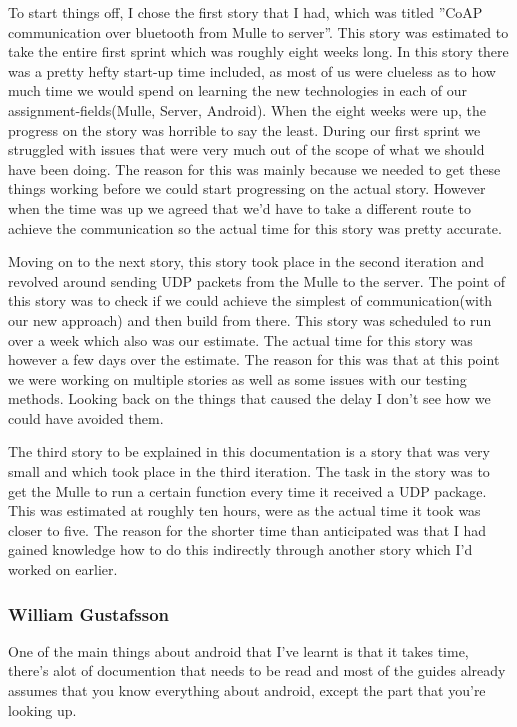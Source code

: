 To start things off, I chose the first story that I had, which was titled ''CoAP communication over bluetooth from Mulle to server''.
This story was estimated to take the entire first sprint which was roughly eight weeks long. In this story there was a pretty hefty start-up time included, 
as most of us were clueless as to how much time we would spend on learning the new technologies in each of our assignment-fields(Mulle, Server, Android).
When the eight weeks were up, the progress on the story was horrible to say the least. During our first sprint we struggled with issues that were very much 
out of the scope of what we should have been doing. The reason for this was mainly because we needed to get these things working before we could start progressing on the actual story.
However when the time was up we agreed that we'd have to take a different route to achieve the communication so the actual time for this story was pretty accurate.

Moving on to the next story, this story took place in the second iteration and revolved around sending UDP packets from the Mulle to the server.
The point of this story was to check if we could achieve the simplest of communication(with our new approach) and then build from there. This story was scheduled to run over 
a week  which also was our estimate. The actual time for this story was however a few days over the estimate. The reason for this was that at this point we were working on multiple stories as
well as some issues with our testing methods. Looking back on the things that caused the delay I don't see how we could have avoided them.

The third story to be explained in this documentation is a story that was very small and which took place in the third iteration.
The task in the story was to get the Mulle to run a certain function every time it received a UDP package. This was estimated at roughly ten hours, 
were as the actual time it took was closer to five. The reason for the shorter time than anticipated was that I had gained knowledge how to do this 
indirectly through another story which I'd worked on earlier.

\subsubsection{William Gustafsson}
One of the main things about android that I've learnt is that it takes time, there's alot of documention that needs to be read and most of the guides already assumes that you know everything about android, except the part that you're looking up.

